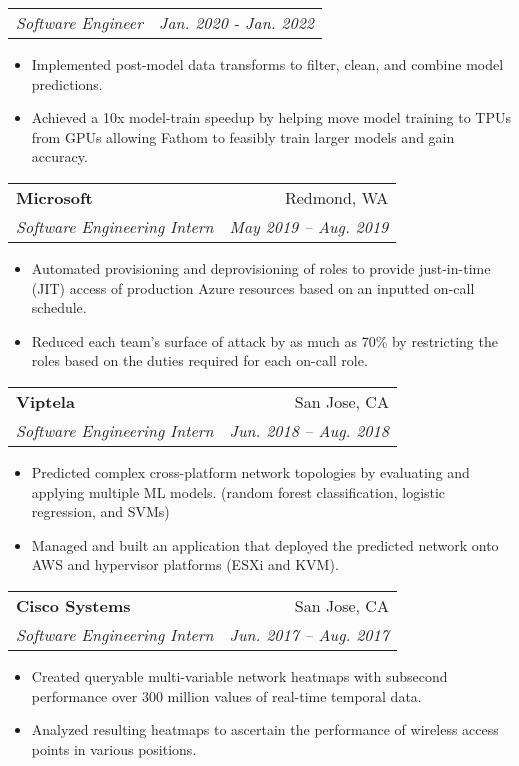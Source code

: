 \documentclass[letterpaper,11pt]{article}
\makeatletter
\newcommand{\resumeItem}[1]{
    \item\small{
            {#1 \vspace{-2pt}}
    }
}
\newcommand{\resumeSubheading}[4]{
    \vspace{-2pt}\item
    \begin{tabular*}{0.97\textwidth}[t]{l@{\extracolsep{\fill}}r}
        \textbf{#1}       & #2                 \\
        \textit{\small#3} & \textit{\small #4} \\
    \end{tabular*}\vspace{-7pt}
}
\newcommand{\resumeSubSubheading}[2]{
    \item
    \begin{tabular*}{0.97\textwidth}{l@{\extracolsep{\fill}}r}
        \textit{\small#1} & \textit{\small #2} \\
    \end{tabular*}\vspace{-7pt}
}
\newcommand{\resumeItemListStart}{\begin{itemize}}
\newcommand{\resumeItemListEnd}{\end{itemize}\vspace{-5pt}}
\makeatother
\begin{document}
\resumeSubSubheading{Software Engineer}{Jan. 2020 - Jan. 2022}
\resumeItemListStart
\resumeItem{Implemented post-model data transforms to filter, clean, and combine model predictions.}
\resumeItem{Achieved a 10x model-train speedup by helping move model training to TPUs from GPUs allowing Fathom to feasibly train larger models and gain accuracy.}
\resumeItemListEnd


\resumeSubheading
{Microsoft}{Redmond, WA}
{Software Engineering Intern}{May 2019 -- Aug. 2019}

\resumeItemListStart
\resumeItem{Automated provisioning and deprovisioning of roles to provide just-in-time (JIT) access of production Azure resources based on an inputted on-call schedule.}
\resumeItem{Reduced each team's surface of attack by as much as 70\% by restricting the roles based on the duties required for each on-call role.}
\resumeItemListEnd

\resumeSubheading
{Viptela}{San Jose, CA}
{Software Engineering Intern}{Jun. 2018 -- Aug. 2018}
\resumeItemListStart
\resumeItem{Predicted complex cross-platform network topologies by evaluating and applying multiple ML models. (random forest classification, logistic regression, and SVMs)}
\resumeItem{Managed and built an application that deployed the predicted network onto AWS and hypervisor platforms (ESXi and KVM).}
\resumeItemListEnd

\resumeSubheading
{Cisco Systems}{San Jose, CA}
{Software Engineering Intern}{Jun. 2017 -- Aug. 2017}
\resumeItemListStart
\resumeItem{Created queryable multi-variable network heatmaps with subsecond performance over 300 million values of real-time temporal data.}
\resumeItem{Analyzed resulting heatmaps to ascertain the performance of wireless access points in various positions.}
\resumeItemListEnd

\end{document}
